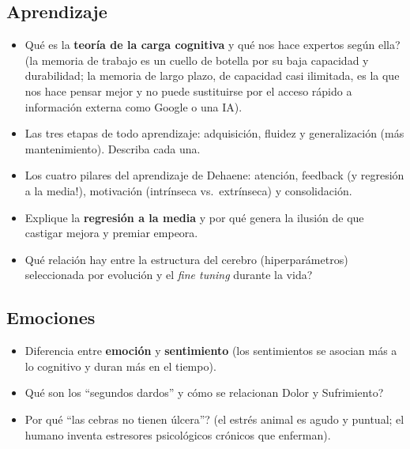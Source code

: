 \documentclass[11pt, a4paper]{article}
\begin{document}
\subsection*{Aprendizaje}
\begin{itemize}[nosep]
    \item \textquestiondown Qu\'e es la \textbf{teor\'ia de la carga cognitiva} y qu\'e nos hace expertos seg\'un ella? (la memoria de trabajo es un cuello de botella por su baja capacidad y durabilidad; la memoria de largo plazo, de capacidad casi ilimitada, es la que nos hace pensar mejor y no puede sustituirse por el acceso r\'apido a informaci\'on externa como Google o una IA).
    \item Las tres etapas de todo aprendizaje: adquisici\'on, fluidez y generalizaci\'on (m\'as mantenimiento). Describa cada una.
    \item Los cuatro pilares del aprendizaje de Dehaene: atenci\'on, feedback (\textexclamdown y regresi\'on a la media!), motivaci\'on (intr\'inseca vs.\ extr\'inseca) y consolidaci\'on.
    \item Explique la \textbf{regresi\'on a la media} y por qu\'e genera la ilusi\'on de que castigar mejora y premiar empeora.
    \item \textquestiondown Qu\'e relaci\'on hay entre la estructura del cerebro (hiperpar\'ametros) seleccionada por evoluci\'on y el \emph{fine tuning} durante la vida?
\end{itemize}

\subsection*{Emociones}
\begin{itemize}[nosep]
    \item Diferencia entre \textbf{emoci\'on} y \textbf{sentimiento} (los sentimientos se asocian m\'as a lo cognitivo y duran m\'as en el tiempo).
    \item \textquestiondown Qu\'e son los ``segundos dardos'' y c\'omo se relacionan Dolor y Sufrimiento?
    \item \textquestiondown Por qu\'e ``las cebras no tienen \'ulcera''? (el estr\'es animal es agudo y puntual; el humano inventa estresores psicol\'ogicos cr\'onicos que enferman).
\end{itemize}
\end{document}
